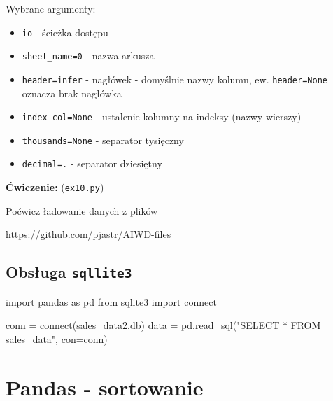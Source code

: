 \documentclass[
  polish,
  letterpaper,
  DIV=11,
  numbers=noendperiod]{scrreprt}
\newenvironment{Shaded}{\begin{snugshade}}{\end{snugshade}}
\newcommand{\ExtensionTok}[1]{\textcolor[rgb]{0.00,0.23,0.31}{#1}}
\newcommand{\ImportTok}[1]{\textcolor[rgb]{0.00,0.46,0.62}{#1}}
\newcommand{\NormalTok}[1]{\textcolor[rgb]{0.00,0.23,0.31}{#1}}
\newcommand{\OperatorTok}[1]{\textcolor[rgb]{0.37,0.37,0.37}{#1}}
\newcommand{\StringTok}[1]{\textcolor[rgb]{0.13,0.47,0.30}{#1}}
\providecommand{\tightlist}{%
  \setlength{\itemsep}{0pt}\setlength{\parskip}{0pt}}
\begin{document}
Wybrane argumenty:

\begin{itemize}
\tightlist
\item
  \texttt{io} - ścieżka dostępu
\item
  \texttt{sheet\_name=0} - nazwa arkusza
\item
  \texttt{header=\textquotesingle{}infer\textquotesingle{}} - nagłówek -
  domyślnie nazwy kolumn, ew. \texttt{header=None} oznacza brak nagłówka
\item
  \texttt{index\_col=None} - ustalenie kolumny na indeksy (nazwy
  wierszy)
\item
  \texttt{thousands=None} - separator tysięczny
\item
  \texttt{decimal=\textquotesingle{}.\textquotesingle{}} - separator
  dziesiętny
\end{itemize}

\textbf{Ćwiczenie:} (\texttt{ex10.py})

Poćwicz ładowanie danych z plików

\url{https://github.com/pjastr/AIWD-files}

\section{\texorpdfstring{Obsługa
\texttt{sqllite3}}{Obsługa sqllite3}}\label{obsux142uga-sqllite3}

\begin{Shaded}
\begin{Highlighting}[]
\ImportTok{import}\NormalTok{ pandas }\ImportTok{as}\NormalTok{ pd}
\ImportTok{from}\NormalTok{ sqlite3 }\ImportTok{import} \ExtensionTok{connect}

\NormalTok{conn }\OperatorTok{=} \ExtensionTok{connect}\NormalTok{(}\StringTok{\textquotesingle{}sales\_data2.db\textquotesingle{}}\NormalTok{)}
\NormalTok{data }\OperatorTok{=}\NormalTok{ pd.read\_sql(}\StringTok{"SELECT * FROM sales\_data"}\NormalTok{, con}\OperatorTok{=}\NormalTok{conn)}
\end{Highlighting}
\end{Shaded}

\chapter{Pandas - sortowanie}\label{pandas---sortowanie}
\end{document}
